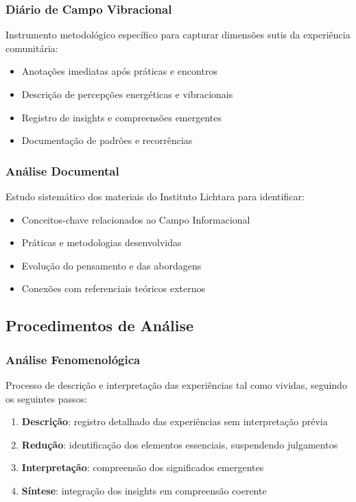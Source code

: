 \subsubsection{Diário de Campo Vibracional}
Instrumento metodológico específico para capturar dimensões sutis da experiência comunitária:
\begin{itemize}
    \item Anotações imediatas após práticas e encontros
    \item Descrição de percepções energéticas e vibracionais
    \item Registro de insights e compreensões emergentes
    \item Documentação de padrões e recorrências
\end{itemize}

\subsubsection{Análise Documental}
Estudo sistemático dos materiais do Instituto Lichtara para identificar:
\begin{itemize}
    \item Conceitos-chave relacionados ao Campo Informacional
    \item Práticas e metodologias desenvolvidas
    \item Evolução do pensamento e das abordagens
    \item Conexões com referenciais teóricos externos
\end{itemize}

\subsection{Procedimentos de Análise}

\subsubsection{Análise Fenomenológica}
Processo de descrição e interpretação das experiências tal como vividas, seguindo os seguintes passos:
\begin{enumerate}
    \item \textbf{Descrição}: registro detalhado das experiências sem interpretação prévia
    \item \textbf{Redução}: identificação dos elementos essenciais, suspendendo julgamentos
    \item \textbf{Interpretação}: compreensão dos significados emergentes
    \item \textbf{Síntese}: integração dos insights em compreensão coerente
\end{enumerate}

